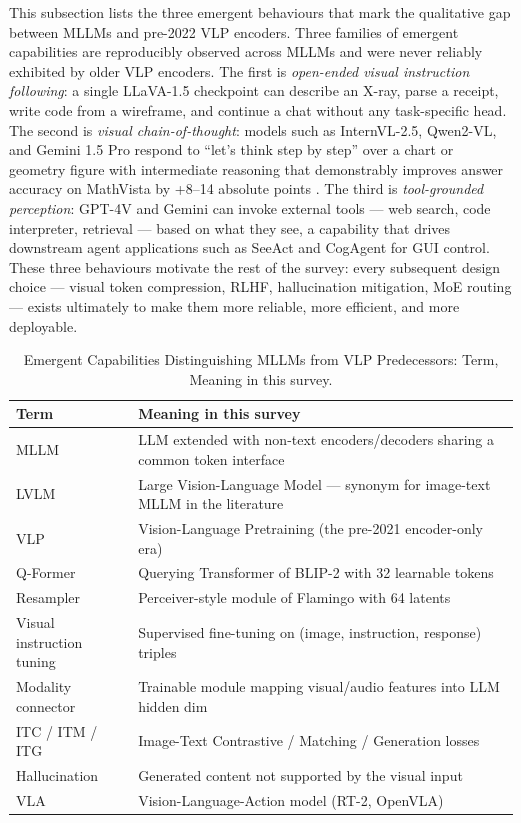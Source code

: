 \documentclass{article}
\begin{document}
This subsection lists the three emergent behaviours that mark the qualitative gap between MLLMs and pre-2022 VLP encoders. Three families of emergent capabilities are reproducibly observed across MLLMs and were never reliably exhibited by older VLP encoders. The first is \emph{open-ended visual instruction following}: a single LLaVA-1.5 checkpoint can describe an X-ray, parse a receipt, write code from a wireframe, and continue a chat without any task-specific head. The second is \emph{visual chain-of-thought}: models such as InternVL-2.5, Qwen2-VL, and Gemini 1.5 Pro respond to ``let's think step by step'' over a chart or geometry figure with intermediate reasoning that demonstrably improves answer accuracy on MathVista by +8--14 absolute points \citep{lu20242024}. The third is \emph{tool-grounded perception}: GPT-4V and Gemini can invoke external tools --- web search, code interpreter, retrieval --- based on what they see, a capability that drives downstream agent applications such as SeeAct \citep{zheng20242024} and CogAgent for GUI control. These three behaviours motivate the rest of the survey: every subsequent design choice --- visual token compression, RLHF, hallucination mitigation, MoE routing --- exists ultimately to make them more reliable, more efficient, and more deployable.

\begin{table}[t]
\centering
\caption{Emergent Capabilities Distinguishing MLLMs from VLP Predecessors: Term, Meaning in this survey.}
\label{tab:emergent-capabilities-distinguishing-mllms-from-vlp-predeces}
\begin{tabular}{>{\raggedright\arraybackslash}p{0.2451\linewidth}
  >{\raggedright\arraybackslash}p{0.7549\linewidth}}
\toprule
\textbf{Term} & \textbf{Meaning in this survey} \\
\midrule
MLLM & LLM extended with non-text encoders/decoders sharing a common token interface \\
LVLM & Large Vision-Language Model --- synonym for image-text MLLM in the literature \\
VLP & Vision-Language Pretraining (the pre-2021 encoder-only era) \\
Q-Former & Querying Transformer of BLIP-2 with 32 learnable tokens \\
Resampler & Perceiver-style module of Flamingo with 64 latents \\
Visual instruction tuning & Supervised fine-tuning on (image, instruction, response) triples \\
Modality connector & Trainable module mapping visual/audio features into LLM hidden dim \\
ITC / ITM / ITG & Image-Text Contrastive / Matching / Generation losses \\
Hallucination & Generated content not supported by the visual input \\
VLA & Vision-Language-Action model (RT-2, OpenVLA) \\
\end{tabular}
\end{table}
\end{document}

